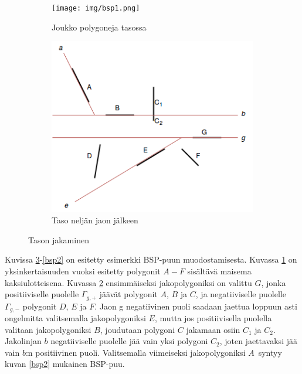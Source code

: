 ﻿\documentclass[a4paper,12pt, titlepage]{article}
\begin{document}
\begin{figure}
 \centering
 \begin{subfigure}{0.5\textwidth} 
  \centering
  \texttt{[image: img/bsp1.png]}
  \vspace{0.7cm}
  \caption{Joukko polygoneja tasossa}
  \label{bsp11}
 \end{subfigure}%
 \begin{subfigure}{0.5\textwidth} 
  \centering
  \includegraphics[width=0.9\linewidth]{img/bsp2.png}
  \caption{Taso neljän jaon jälkeen}
  \label{bsp12}
 \end{subfigure}
 \caption{Tason jakaminen}
 \label{bsp1}
\end{figure}

Kuvissa \ref{bsp1}-\ref{bsp2} on esitetty esimerkki BSP-puun muodostamisesta. Kuvassa \ref{bsp11} on yksinkertaisuuden vuoksi esitetty polygonit $A-F$ sisältävä maisema kaksiulotteisena. Kuvassa \ref{bsp12} ensimmäiseksi jakopolygoniksi on valittu $G$, jonka positiiviselle puolelle $\Gamma_{g,+}$ jäävät polygonit $A$, $B$ ja $C$, ja negatiiviselle puolelle $\Gamma_{g,-}$ polygonit $D$, $E$ ja $F$. Jaon g negatiivinen puoli saadaan jaettua loppuun asti ongelmitta valitsemalla jakopolygoniksi $E$, mutta jos positiivisella puolella valitaan jakopolygoniksi $B$, joudutaan polygoni $C$ jakamaan osiin $C_1$ ja $C_2$. Jakolinjan $b$ negatiiviselle puolelle jää vain yksi polygoni $C_2$, joten jaettavaksi jää vain $b$:n positiivinen puoli. Valitsemalla viimeiseksi jakopolygoniksi $A$ syntyy kuvan \ref{bsp2} mukainen BSP-puu.\\
\end{document}
